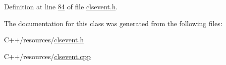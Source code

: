 Definition at line \hyperlink{clsevent_8h_source_l00084}{84} of file \hyperlink{clsevent_8h_source}{clsevent.\-h}.



The documentation for this class was generated from the following files\-:\begin{DoxyCompactItemize}
\item 
C++/resources/\hyperlink{clsevent_8h}{clsevent.\-h}\item 
C++/resources/\hyperlink{clsevent_8cpp}{clsevent.\-cpp}\end{DoxyCompactItemize}
